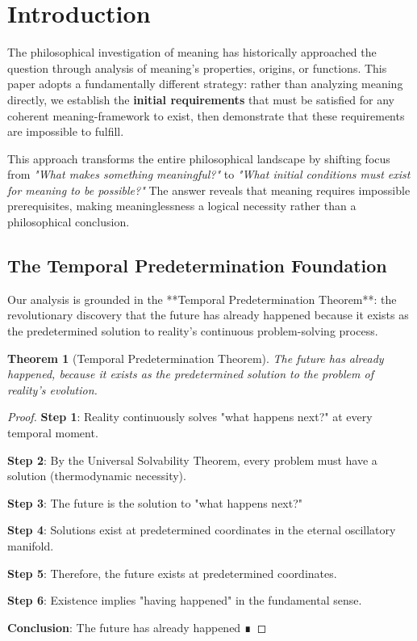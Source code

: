 \documentclass[12pt,a4paper]{article}
\newtheorem{theorem}{Theorem}[section]
\begin{document}
\section{Introduction}

The philosophical investigation of meaning has historically approached the question through analysis of meaning's properties, origins, or functions. This paper adopts a fundamentally different strategy: rather than analyzing meaning directly, we establish the \textbf{initial requirements} that must be satisfied for any coherent meaning-framework to exist, then demonstrate that these requirements are impossible to fulfill.

This approach transforms the entire philosophical landscape by shifting focus from \textit{"What makes something meaningful?"} to \textit{"What initial conditions must exist for meaning to be possible?"} The answer reveals that meaning requires impossible prerequisites, making meaninglessness a logical necessity rather than a philosophical conclusion.

\subsection{The Temporal Predetermination Foundation}

Our analysis is grounded in the **Temporal Predetermination Theorem**: the revolutionary discovery that the future has already happened because it exists as the predetermined solution to reality's continuous problem-solving process.

\begin{theorem}[Temporal Predetermination Theorem]
The future has already happened, because it exists as the predetermined solution to the problem of reality's evolution.
\end{theorem}

\begin{proof}
\textbf{Step 1}: Reality continuously solves "what happens next?" at every temporal moment.

\textbf{Step 2}: By the Universal Solvability Theorem, every problem must have a solution (thermodynamic necessity).

\textbf{Step 3}: The future is the solution to "what happens next?"

\textbf{Step 4}: Solutions exist at predetermined coordinates in the eternal oscillatory manifold.

\textbf{Step 5}: Therefore, the future exists at predetermined coordinates.

\textbf{Step 6}: Existence implies "having happened" in the fundamental sense.

\textbf{Conclusion}: The future has already happened ∎
\end{proof}
\end{document}
